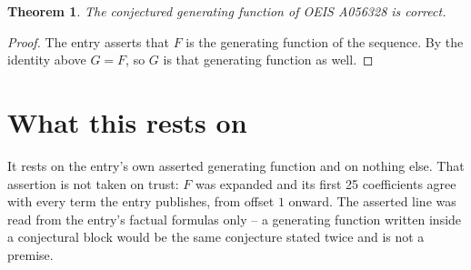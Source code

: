 \documentclass[11pt,a4paper]{article}
\theoremstyle{plain}
\newtheorem{theorem}{Theorem}
\theoremstyle{definition}
\begin{document}
\begin{theorem}
The conjectured generating function of OEIS A056328 is correct.
\end{theorem}

\begin{proof}
The entry asserts that $F$ is the generating function of the sequence. By the identity above
$G=F$, so $G$ is that generating function as well.
\end{proof}

\section{What this rests on}

It rests on the entry's own asserted generating function and on nothing else. That assertion is
not taken on trust: $F$ was expanded and its first 25 coefficients agree with every
term the entry publishes, from offset $1$ onward. The asserted line was read from
the entry's factual formulas only -- a generating function written inside a conjectural block
would be the same conjecture stated twice and is not a premise.
\end{document}
